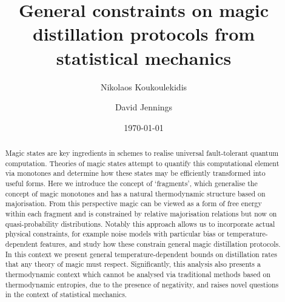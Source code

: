 \documentclass[pra,
aps,
twocolumn,
superscriptaddress,
groupedaddress,
nofootinbib,
reprint
]{revtex4-1}
\begin{document}



\begin{abstract}
\ddd{[To be sharpened]} Magic states are key ingredients in schemes to realise universal fault-tolerant quantum computation.
Theories of magic states attempt to quantify this computational element via monotones and determine how these states may be efficiently transformed into useful forms. Here we introduce the concept of `fragments', which generalise the concept of magic monotones and has a natural thermodynamic structure based on majorisation. From this perspective magic can be viewed as a form of free energy within each fragment and is constrained by relative majorisation relations but now on quasi-probability distributions. Notably this approach allows us to incorporate actual physical constraints, for example noise models with particular bias or temperature-dependent features, and study how these constrain general magic distillation protocols. In this context we present general temperature-dependent bounds on distillation rates that any theory of magic must respect. Significantly, this analysis also presents a thermodynamic context which cannot be analysed via traditional methods based on thermodynamic entropies, due to the presence of negativity, and raises novel questions in the context of statistical mechanics.
\end{abstract}


\title{General constraints on magic distillation protocols from statistical mechanics}

\author{Nikolaos Koukoulekidis}
\author{David Jennings}

\date{\today}
\maketitle
\end{document}
